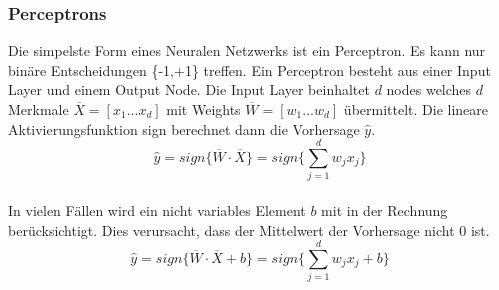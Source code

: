 
\subsubsection{Perceptrons}
Die simpelste Form eines Neuralen Netzwerks ist ein Perceptron. Es kann nur binäre Entscheidungen \{-1,+1\} treffen. Ein Perceptron besteht aus einer Input Layer und einem Output Node.
Die Input Layer beinhaltet $d$ nodes welches $d$ Merkmale $\overline{X} = [x_1...x_d]$ mit Weights $\overline{W} = [w_1...w_d]$ übermittelt. Die lineare Aktivierungsfunktion sign berechnet
dann die Vorhersage $\hat{y}$. \cite{CA18}\\
$$\hat{y} = sign\{\overline{W} \cdot \overline{X}\} = sign\{\sum\limits^{d}_{j=1}w_jx_j\}$$\\
In vielen Fällen wird ein nicht variables Element $b$ mit in der Rechnung berücksichtigt. Dies verursacht, dass der Mittelwert der Vorhersage nicht 0 ist. \cite{CA18}\\
$$\hat{y} = sign\{\overline{W} \cdot \overline{X} + b\} = sign\{\sum\limits^{d}_{j=1}w_jx_j + b\}$$\\
